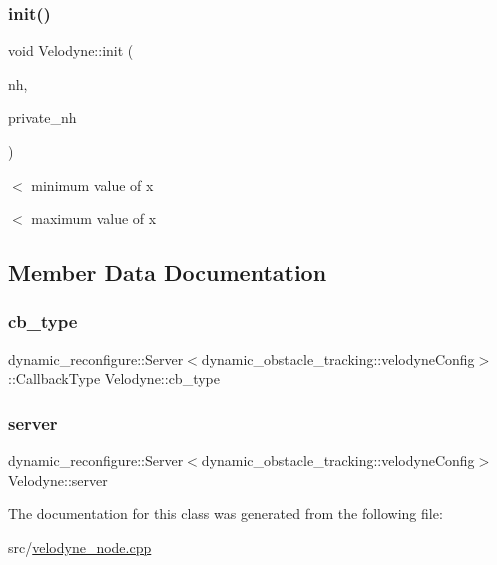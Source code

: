 \mbox{\label{classVelodyne_acc1ec7c74ba56c6330d94481960459a1}} 
\subsubsection{\texorpdfstring{init()}{init()}}
{\footnotesize\ttfamily void Velodyne\+::init (\begin{DoxyParamCaption}\item[{ros\+::\+Node\+Handle \&}]{nh,  }\item[{ros\+::\+Node\+Handle \&}]{private\+\_\+nh }\end{DoxyParamCaption})}

$<$ minimum value of x

$<$ maximum value of x 

\subsection{Member Data Documentation}
\mbox{\label{classVelodyne_aba02cf51ec41e7289dc2df2511d421ce}} 
\subsubsection{\texorpdfstring{cb\+\_\+type}{cb\_type}}
{\footnotesize\ttfamily dynamic\+\_\+reconfigure\+::\+Server$<$dynamic\+\_\+obstacle\+\_\+tracking\+::velodyne\+Config$>$\+::Callback\+Type Velodyne\+::cb\+\_\+type\hspace{0.3cm}{\ttfamily [protected]}}

\mbox{\label{classVelodyne_ae3c8869e849b22dad034e50dfbfccc1d}} 
\subsubsection{\texorpdfstring{server}{server}}
{\footnotesize\ttfamily dynamic\+\_\+reconfigure\+::\+Server$<$dynamic\+\_\+obstacle\+\_\+tracking\+::velodyne\+Config$>$ Velodyne\+::server\hspace{0.3cm}{\ttfamily [protected]}}



The documentation for this class was generated from the following file\+:\begin{DoxyCompactItemize}
\item 
src/\hyperlink{velodyne__node_8cpp}{velodyne\+\_\+node.\+cpp}\end{DoxyCompactItemize}
